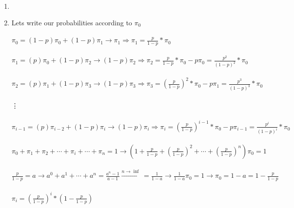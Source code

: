 \usetikzlibrary{automata, positioning}
\begin{enumerate}
  \item \phantom{text}
  \begin{latin}
    \noindent
 \end{latin}
 \item \phantom{text}
  \begin{latin}
    \noindent
    Lets write our probabilities according to $\pi_0$\\\\
    $\pi_0 = (1-p)\pi_0 + (1-p)\pi_1 \rightarrow \pi_1 \Rightarrow \pi_1 = \frac{p}{1-p}*\pi_0$ \\\\
    $\pi_1 = (p)\pi_0 + (1-p)\pi_2 \rightarrow (1-p)\pi_2 \Rightarrow \pi_2  = \frac{p}{1-p}*\pi_0 - p\pi_0=\frac{p^2}{(1-p)^2}*\pi_0$ \\\\
    $\pi_2 = (p)\pi_1 + (1-p)\pi_3 \rightarrow (1-p)\pi_3 \Rightarrow \pi_3  = (\frac{p}{1-p})^2*\pi_0 - p\pi_1=\frac{p^3}{(1-p)^3}*\pi_0$ \\\\
    \vdots \\\\
    $\pi_{i-1} = (p)\pi_{i-2} + (1-p)\pi_{i} \rightarrow (1-p)\pi_{i} \Rightarrow \pi_i = (\frac{p}{1-p})^{i-1}*\pi_0 - p\pi_{i-1}=\frac{p^i}{(1-p)^{i}}*\pi_0$ \\\\
    $\pi_0 + \pi_1 + \pi_2 + \cdots + \pi_i + \cdots +\pi_n = 1 \rightarrow (1 + \frac{p}{1-p} + (\frac{p}{1-p})^2+\cdots+(\frac{p}{1-p})^n)\pi_0 = 1$ \\\\
    $\frac{p}{1-p} = a \rightarrow a^0 + a^1 + \cdots + a^n = \frac{a^n-1}{a-1}\xrightarrow[]{n \rightarrow \inf} = \frac{1}{1-a}\rightarrow \frac{1}{1-a}\pi_0=1\rightarrow\pi_0 = 1 - a = 1 - \frac{p}{1-p}$\\\\
    $\pi_i = (\frac{p}{1-p})^i * (1 - \frac{p}{1-p})$
  

\end{latin}
\end{enumerate}
